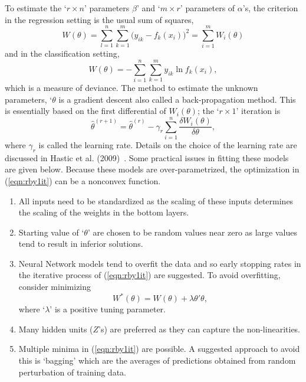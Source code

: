 To estimate the `$r \times n$' parameters $\beta$' and `$m \times r$' parameters of $\alpha$'s, the criterion in the regression setting is the usual sum of squares,
	\begin{equation}\label{eqn:bigwtheta}
	W(\theta)= \sum_{l=1}^n \sum_{k=1}^m \big(y_{ik} - f_k(x_i)\big)^2 = \sum_{i=1}^m W_i(\theta)
	\end{equation}
and in the classification setting,
	\begin{equation}\label{eqn:bigwtheta2}
	W(\theta)= - \sum_{i=1}^n \sum_{k=1}^m y_{ik} \ln f_k(x_i),
	\end{equation}
which is a measure of deviance. The method to estimate the unknown parameters, `$\theta$ is a gradient descent also called a back-propagation method. This is essentially based on the first differential of $W_i(\theta)$; the `$r \times 1$' iteration is
	\begin{equation}\label{eqn:rby1it}
	\hat{\theta}^{(r+1)}= \hat{\theta}^{(r)} - \gamma_r \sum_{i=1}^n \dfrac{\delta W_i(\theta)}{\delta \theta},
	\end{equation}
where $\gamma_r$ is called the learning rate. Details on the choice of the learning rate are discussed in Hastic et al. (2009)~\cite{hastibf}. Some practical issues in fitting these models are given below. Because these models are over-parametrized, the optimization in (\ref{eqn:rby1it}) can be a nonconvex function.

\begin{enumerate}[--]
\item All inputs need to be standardized as the scaling of these inputs determines the scaling of the weights in the bottom layers.
\item Starting value of `$\theta$' are chosen to be random values near zero as large values tend to result in inferior solutions.
\item Neural Network models tend to overfit the data and so early stopping rates in the iterative process of (\ref{eqn:rby1it}) are suggested. To avoid overfitting, consider minimizing 
	\begin{equation}\label{eqn:overfit}
	W^*(\theta)= W(\theta) + \lambda \theta' \theta,
	\end{equation}
where `$\lambda$' is a positive tuning parameter.
\item Many hidden units ($Z$'s) are preferred as they can capture the non-linearities. 
\item Multiple minima in (\ref{eqn:rby1it}) are possible. A suggested approach to avoid this is `bagging' which are the averages of predictions obtained from random perturbation of training data. 
\end{enumerate}





